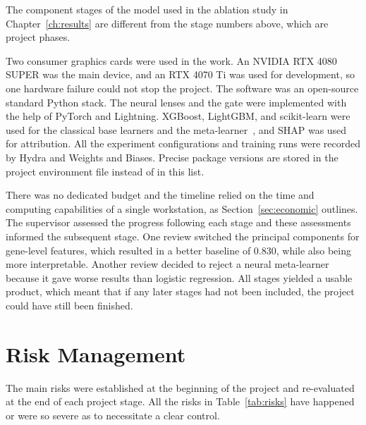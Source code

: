 The component stages of the model used in the ablation study in Chapter~\ref{ch:results} are
different from the stage numbers above, which are project phases.

Two consumer graphics cards were used in the work. An NVIDIA RTX 4080 SUPER was the main
device, and an RTX 4070 Ti was used for development, so one hardware failure could not stop the
project. The software was an open-source standard Python stack. The neural lenses and the gate
were implemented with the help of PyTorch and Lightning. XGBoost, LightGBM, and scikit-learn
were used for the classical base learners and the
meta-learner~\cite{chen2016xgboost, ke2017lightgbm, breiman2001rf}, and SHAP was used for
attribution. All the experiment configurations and training runs were recorded by Hydra and
Weights and Biases. Precise package versions are stored in the project environment file instead
of in this list.

There was no dedicated budget and the timeline relied on the time and computing capabilities of
a single workstation, as Section~\ref{sec:economic} outlines. The supervisor assessed the
progress following each stage and these assessments informed the subsequent stage. One review
switched the principal components for gene-level features, which resulted in a better baseline
of 0.830, while also being more interpretable. Another review decided to reject a neural
meta-learner because it gave worse results than logistic regression. All stages yielded a
usable product, which meant that if any later stages had not been included, the project could
have still been finished.

\section{Risk Management}
\label{sec:risk}

The main risks were established at the beginning of the project and re-evaluated at the end of
each project stage. All the risks in Table~\ref{tab:risks} have happened or were so severe as
to necessitate a clear control.

